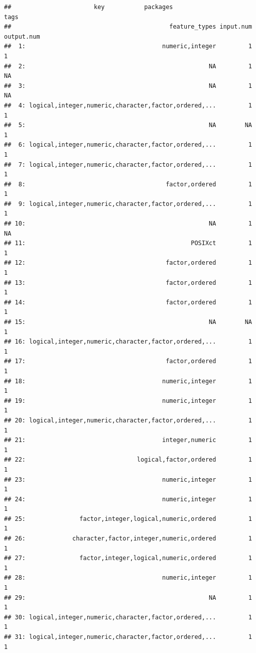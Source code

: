 \documentclass[
]{scrbook}
\begin{document}
\begin{verbatim}
##                       key           packages                             tags
##                                            feature_types input.num output.num
##  1:                                      numeric,integer         1          1
##  2:                                                   NA         1         NA
##  3:                                                   NA         1         NA
##  4: logical,integer,numeric,character,factor,ordered,...         1          1
##  5:                                                   NA        NA          1
##  6: logical,integer,numeric,character,factor,ordered,...         1          1
##  7: logical,integer,numeric,character,factor,ordered,...         1          1
##  8:                                       factor,ordered         1          1
##  9: logical,integer,numeric,character,factor,ordered,...         1          1
## 10:                                                   NA         1         NA
## 11:                                              POSIXct         1          1
## 12:                                       factor,ordered         1          1
## 13:                                       factor,ordered         1          1
## 14:                                       factor,ordered         1          1
## 15:                                                   NA        NA          1
## 16: logical,integer,numeric,character,factor,ordered,...         1          1
## 17:                                       factor,ordered         1          1
## 18:                                      numeric,integer         1          1
## 19:                                      numeric,integer         1          1
## 20: logical,integer,numeric,character,factor,ordered,...         1          1
## 21:                                      integer,numeric         1          1
## 22:                               logical,factor,ordered         1          1
## 23:                                      numeric,integer         1          1
## 24:                                      numeric,integer         1          1
## 25:               factor,integer,logical,numeric,ordered         1          1
## 26:             character,factor,integer,numeric,ordered         1          1
## 27:               factor,integer,logical,numeric,ordered         1          1
## 28:                                      numeric,integer         1          1
## 29:                                                   NA         1          1
## 30: logical,integer,numeric,character,factor,ordered,...         1          1
## 31: logical,integer,numeric,character,factor,ordered,...         1          1

\end{verbatim}
\end{document}
